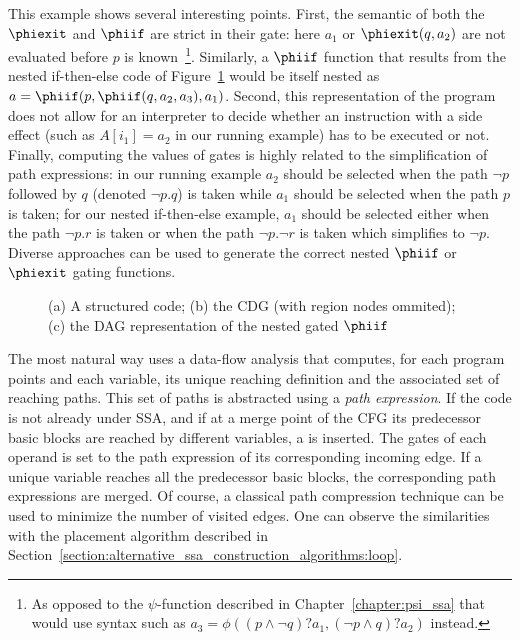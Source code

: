 This example shows several interesting points. 
First, the semantic of both the $\phiexit$ and $\phiif$ are strict in their gate: 
here $a_1$ or $\phiexit(q,a_2)$ are not evaluated before $p$ is known~\footnote{As opposed to the $\psi$-function described in Chapter~\ref{chapter:psi_ssa} that would use syntax such as $a_3=\phi((p\wedge \lnot q)?a_1, (\lnot p\wedge q)?a_2)$ instead.}. 
Similarly, a $\phiif$ function that results from the nested if-then-else code of Figure~\ref{fig:vsdg:structured} would be itself nested as $a=\phiif(p,\phiif(q,a_2,a_3),a_1)$. 
Second, this representation of the program does not allow for an interpreter to decide whether an instruction with a side effect (such as $A[i_1]=a_2$ in our running example) has to be executed or not. 
Finally, computing the values of gates is highly related to the simplification of path expressions: 
in our running example $a_2$ should be selected when the path $\lnot p$ followed by $q$ (denoted $\lnot p . 
q$) is taken while $a_1$ should be selected when the path $p$ is taken; 
for our nested if-then-else example, $a_1$ should be selected either when the path $\lnot p . 
r$ is taken or when the path $\lnot p . 
\lnot r$ is taken which simplifies to $\lnot p$. 
Diverse approaches can be used to generate the correct nested $\phiif$ or $\phiexit$ gating functions.

\begin{figure}
\caption{(a) A structured code; (b) the CDG (with region nodes ommited); (c) the DAG representation of the nested gated $\phiif$ \label{fig:vsdg:structured}}
\end{figure}

The most natural way uses a data-flow analysis that computes, for each program points and each variable, its unique reaching definition and the associated set of reaching paths. 
This set of paths is abstracted using a \emph{path expression}. 
If the code is not already under SSA, and if at a merge point of the CFG its predecessor basic blocks are reached by different variables, a \phifun is inserted. 
The gates of each operand is set to the path expression of its corresponding incoming edge. 
If a unique variable reaches all the predecessor basic blocks, the corresponding path expressions are merged. 
Of course, a classical path compression technique can be used to minimize the number of visited edges. 
One can observe the similarities with the \phifun placement algorithm described in Section~\ref{section:alternative_ssa_construction_algorithms:loop}.

